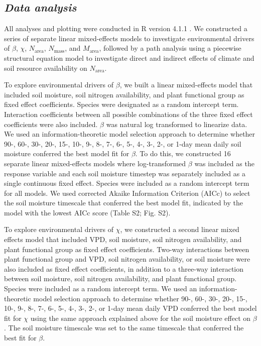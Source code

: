 \subsection{\textit{Data analysis}}
All analyses and plotting were conducted in R version 4.1.1 . We constructed a series of separate linear mixed-effects models to investigate environmental drivers of $\beta$, $\chi$, $N_\mathrm{area}$, $N_\mathrm{mass}$, and $M_\mathrm{area}$, followed by a path analysis using a piecewise structural equation model to investigate direct and indirect effects of climate and soil resource availability on $N_\mathrm{area}$.

To explore environmental drivers of $\beta$, we built a linear mixed-effects model that included soil moisture, soil nitrogen availability, and plant functional group as fixed effect coefficients. Species were designated as a random intercept term. Interaction coefficients between all possible combinations of the three fixed effect coefficients were also included. $\beta$ was natural log transformed to linearize data. We used an information-theoretic model selection approach to determine whether 90-, 60-, 30-, 20-, 15-, 10-, 9-, 8-, 7-, 6-, 5-, 4-, 3-, 2-, or 1-day mean daily soil moisture conferred the best model fit for $\beta$. To do this, we constructed 16 separate linear mixed-effects models where log-transformed $\beta$ was included as the response variable and each soil moisture timestep was separately included as a single continuous fixed effect. Species were included as a random intercept term for all models. We used corrected Akaike Information Criterion (AICc) to select the soil moisture timescale that conferred the best model fit, indicated by the model with the lowest AICc score (Table S2; Fig. S2).

To explore environmental drivers of $\chi$, we constructed a second linear mixed effects model that included VPD, soil moisture, soil nitrogen availability, and plant functional group as fixed effect coefficients. Two-way interactions between plant functional group and VPD, soil nitrogen availability, or soil moisture were also included as fixed effect coefficients, in addition to a three-way interaction between soil moisture, soil nitrogen availability, and plant functional group. Species were included as a random intercept term. We used an information-theoretic model selection approach to determine whether 90-, 60-, 30-, 20-, 15-, 10-, 9-, 8-, 7-, 6-, 5-, 4-, 3-, 2-, or 1-day mean daily VPD conferred the best model fit for $\chi$ using the same approach explained above for the soil moisture effect on $\beta$. The soil moisture timescale was set to the same timescale that conferred the best fit for $\beta$.

